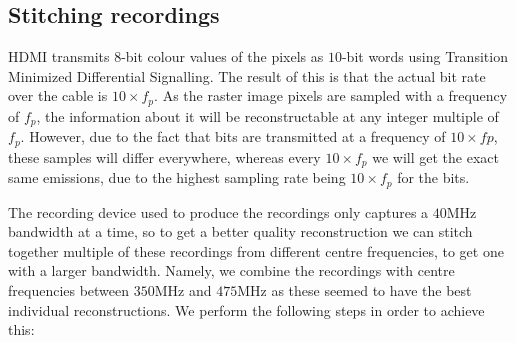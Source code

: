 \documentclass{article}
\begin{document}
\subsection{Stitching recordings}
\label{sec:stitching}

HDMI transmits $8$-bit colour values of the pixels as $10$-bit words using Transition Minimized Differential Signalling. The result of this is that the actual bit rate over the cable is $10 \times f_p$. As the raster image pixels are sampled with a frequency of $f_p$, the information about it will be reconstructable at any integer multiple of $f_p$. However, due to the fact that bits are transmitted at a frequency of $10 \times fp$, these samples will differ everywhere, whereas every $10 \times f_p$ we will get the exact same emissions, due to the highest sampling rate being $10 \times f_p$ for the bits.

The recording device used to produce the recordings only captures a $40$MHz bandwidth at a time, so to get a better quality reconstruction we can stitch together multiple of these recordings from different centre frequencies, to get one with a larger bandwidth. Namely, we combine the recordings with centre frequencies between $350$MHz and $475$MHz as these seemed to have the best individual reconstructions. We perform the following steps in order to achieve this:
\end{document}
